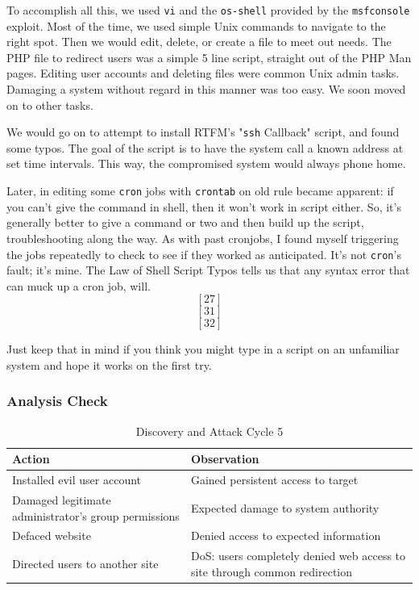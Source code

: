 To accomplish all this, we used \texttt{vi} and the \texttt{os-shell} provided by the \texttt{msfconsole} \gls{exploit}.  Most of the time, we used simple Unix commands to navigate to the right spot.  Then we would edit, delete, or create a file to meet out needs.  The PHP file to redirect users was a simple 5 line script, straight out of the PHP Man pages.  Editing user accounts and deleting files were common Unix admin tasks.  Damaging a system without regard in this manner was too easy.  We soon moved on to other tasks.

We would go on to attempt to install RTFM's "\texttt{ssh} Callback" script, and found some typos.  The goal of the script is to have the system call a known address at set time intervals.  This way, the compromised system would always phone home.

Later, in editing some \texttt{cron} jobs with \texttt{crontab} on old rule became apparent:  if you can't give the command in shell, then it won't work in script either.  So, it's generally better to give a command or two and then build up the script, troubleshooting along the way.  As with past cronjobs, I found myself triggering the jobs repeatedly to check to see if they worked as anticipated.  It's not \texttt{cron}'s fault; it's mine.  The Law of Shell Script Typos tells us that any syntax error that can muck up a cron job, will.  \[[27]\] \[[31]\] \[[32]\]

Just keep that in mind if you think you might type in a script on an unfamiliar system and hope it works on the first try.




\subsubsection{Analysis Check}
\begin{table}[H]
\caption{Discovery and Attack Cycle 5}
\centering
\begin{tabular}{|l|l|}
\hline
Action & Observation \\
\hline
Installed evil user account & Gained persistent access to target \\
Damaged legitimate administrator's group permissions & Expected damage to system authority \\
Defaced website & Denied access to expected information \\
Directed users to another site & DoS:  users completely denied web access to site through common redirection \\
\hline
\end{tabular}
\end{table}

